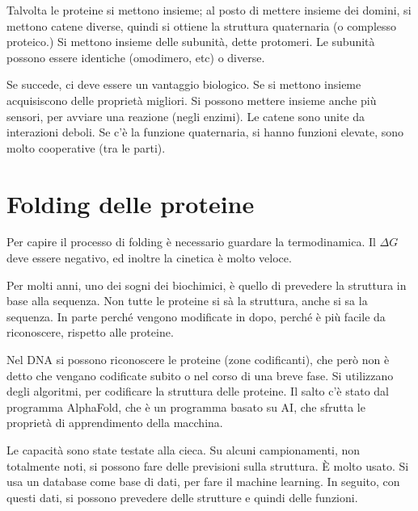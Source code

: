 Talvolta le proteine si mettono insieme; al posto di mettere insieme dei
domini, si mettono catene diverse, quindi si ottiene la struttura
quaternaria (o complesso proteico.)
Si mettono insieme delle subunità, dette protomeri.
Le subunità possono essere identiche (omodimero, etc) o diverse.

Se succede, ci deve essere un vantaggio biologico. Se si mettono insieme
acquisiscono delle proprietà migliori. Si possono mettere insieme anche
più sensori, per avviare una reazione (negli enzimi).
Le catene sono unite da interazioni deboli.
Se c'è la funzione quaternaria, si hanno funzioni elevate, sono molto
cooperative (tra le parti).




\chapter{Folding delle proteine}

Per capire il processo di folding è necessario guardare la termodinamica.
Il $\Delta G$ deve essere negativo, ed inoltre la cinetica è molto veloce.

Per molti anni, uno dei sogni dei biochimici, è quello di prevedere la
struttura in base alla sequenza.
Non tutte le proteine si sà la struttura, anche si sa la sequenza. In
parte perché vengono modificate in dopo, perché è più facile da
riconoscere, rispetto alle proteine.

Nel DNA si possono riconoscere le proteine (zone codificanti), che però
non è detto che vengano codificate subito o nel corso di una breve fase.
Si utilizzano degli algoritmi, per codificare la struttura delle
proteine. Il salto c'è stato dal programma AlphaFold, che è un programma
basato su AI, che sfrutta le proprietà di apprendimento della macchina.

Le capacità sono state testate alla cieca. Su alcuni campionamenti, non
totalmente noti, si possono fare delle previsioni sulla struttura. È
molto usato. Si usa un database come base di dati, per fare il machine
learning. In seguito, con questi dati, si possono prevedere delle
strutture e quindi delle funzioni.

